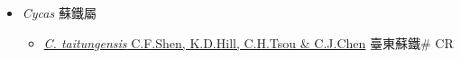 
  \begin{itemize}
 \item[] \textit{Cycas} 蘇鐵屬
                    
  \begin{itemize}
        \item[] \href{http://www.theplantlist.org/tpl1.1/search?q=Cycas+taitungensis}{\textit{C. taitungensis} C.F.Shen, K.D.Hill, C.H.Tsou \& C.J.Chen}   臺東蘇鐵\# CR
  \end{itemize}
  \end{itemize}
